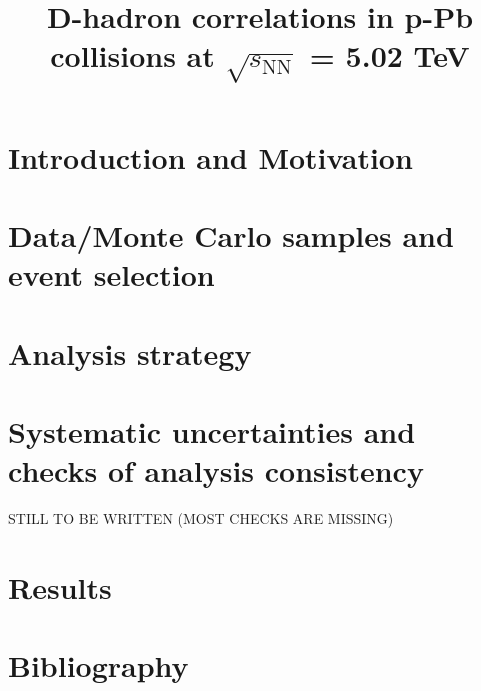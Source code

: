 \documentclass[ALICE,manyauthors]{cernphprep}
\begin{document}
\begin{titlepage}


\PHdate{\today}              %

\title{D-hadron correlations  in p-Pb collisions at $\sqrt{s_\mathrm{NN}}$ = 5.02 TeV}

%




\end{titlepage}

\linenumbers
\tableofcontents

\newpage
\section{Introduction and Motivation}


\newpage
\section{Data/Monte Carlo samples and event selection}


\newpage
\section{Analysis strategy}


\newpage
\section{Systematic uncertainties and checks of analysis consistency}
STILL TO BE WRITTEN (MOST CHECKS ARE MISSING)
%

\newpage
\section{Results}


%

%

\newpage
\section{Bibliography}

\end{document}
